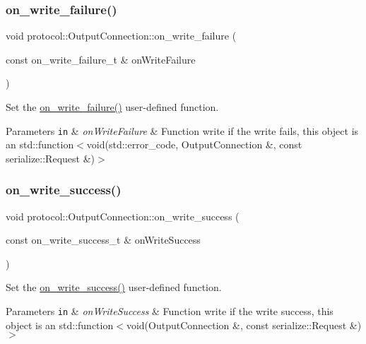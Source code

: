 \subsubsection{\texorpdfstring{on\+\_\+write\+\_\+failure()}{on\_write\_failure()}}
{\footnotesize\ttfamily void protocol\+::\+Output\+Connection\+::on\+\_\+write\+\_\+failure (\begin{DoxyParamCaption}\item[{const on\+\_\+write\+\_\+failure\+\_\+t \&}]{on\+Write\+Failure }\end{DoxyParamCaption})}



Set the \hyperlink{classprotocol_1_1_output_connection_a2c70a552249924bd75e0fe472722c1fc}{on\+\_\+write\+\_\+failure()} user-\/defined function. 


\begin{DoxyParams}[1]{Parameters}
\mbox{\tt in}  & {\em on\+Write\+Failure} & Function write if the write fails, this object is an std\+::function$<$void(std\+::error\+\_\+code, Output\+Connection \&, const serialize\+::\+Request \&)$>$ \\
\hline
\end{DoxyParams}
\mbox{\label{classprotocol_1_1_output_connection_a98750b6398a6280fc778e5c0fb0ea14e}} 
\subsubsection{\texorpdfstring{on\+\_\+write\+\_\+success()}{on\_write\_success()}}
{\footnotesize\ttfamily void protocol\+::\+Output\+Connection\+::on\+\_\+write\+\_\+success (\begin{DoxyParamCaption}\item[{const on\+\_\+write\+\_\+success\+\_\+t \&}]{on\+Write\+Success }\end{DoxyParamCaption})}



Set the \hyperlink{classprotocol_1_1_output_connection_a98750b6398a6280fc778e5c0fb0ea14e}{on\+\_\+write\+\_\+success()} user-\/defined function. 


\begin{DoxyParams}[1]{Parameters}
\mbox{\tt in}  & {\em on\+Write\+Success} & Function write if the write success, this object is an std\+::function$<$void(\+Output\+Connection \&, const serialize\+::\+Request \&)$>$ \\
\hline
\end{DoxyParams}
\mbox{\label{classprotocol_1_1_output_connection_ae457c098638ab42cf1b6ece7f277e72d}} 
